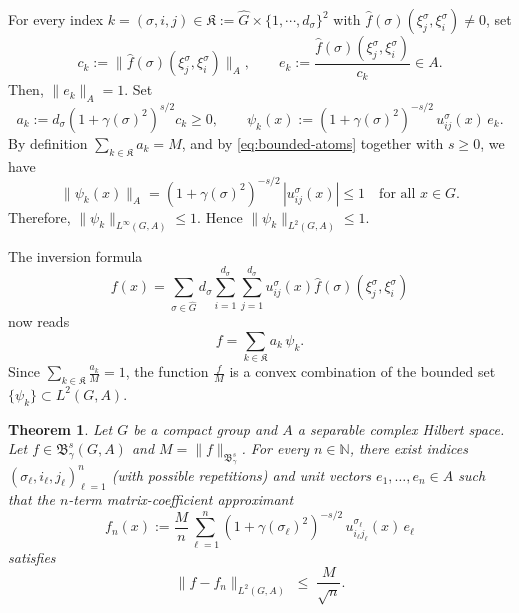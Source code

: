 \documentclass[12pt]{amsart}%
\newtheorem{theorem}{Theorem}[section]
\begin{document}
For every index $k=(\sigma,i,j)\in \mathfrak{K}:=\widehat{G}\times \{1,\cdots,d_\sigma\}^2$ with $\widehat{f}(\sigma)(\xi^\sigma_j,\xi^\sigma_i)\ne 0$, set
$$
c_k := \big\|\widehat{f}(\sigma)(\xi^\sigma_j,\xi^\sigma_i)\big\|_A, \qquad
e_k := \frac{\widehat{f}(\sigma)(\xi^\sigma_j,\xi^\sigma_i)}{c_k} \in A.$$ Then, $\|e_k\|_A=1$.
 Set 
 $$
a_k := d_\sigma (1+\gamma(\sigma)^2)^{s/2} c_k \ge 0, \qquad
\psi_k(x) := (1+\gamma(\sigma)^2)^{-s/2}\, u^\sigma_{ij}(x)\, e_k.
$$
By definition $\sum\limits_{k\in\mathfrak{K}} a_k = M$, and by \eqref{eq:bounded-atoms} together with $s \ge 0$, we have 
$$
\|\psi_k(x)\|_A = (1+\gamma(\sigma)^2)^{-s/2}\,|u^\sigma_{ij}(x)| \le 1
\quad \text{for all } x \in G.
$$
Therefore,  $\|\psi_k\|_{L^\infty(G,A)} \le 1$. Hence $\|\psi_k\|_{L^2(G,A)}\le 1$.
 
The inversion formula
$$
f(x) = \sum_{\sigma\in\widehat{G}} d_\sigma \sum_{i=1}^{d_\sigma}\sum_{j=1}^{d_\sigma}
u^\sigma_{ij}(x)\widehat{f}(\sigma)(\xi^\sigma_j,\xi^\sigma_i)
$$
now reads
\begin{equation}\label{eq:barycenter}
f = \sum_{k\in \mathfrak{K}} a_k\, \psi_k. 
\end{equation} 
Since $\sum\limits_{k\in\mathfrak{K}} \frac{a_k}{M} = 1$, 
the function  $\frac{f}{M}$ is a convex combination  of the bounded
set $\{\psi_k\} \subset L^2(G,A)$.
 
 
\begin{theorem}\label{thm:main}
Let $G$ be a compact group and $A$ a separable complex Hilbert space. Let  $f \in \mathfrak{B}^s_\gamma(G,A)$ and $M = \|f\|_{\mathfrak{B}^s_\gamma}$. For every $n \in \mathbb{N}$, 
there exist indices $(\sigma_\ell,i_\ell,j_\ell)_{\ell=1}^n$ (with possible
repetitions) and unit vectors $e_1,\dots,e_n \in A$ such that the $n$-term
matrix-coefficient approximant
\[
f_n(x) := \frac{M}{n} \sum_{\ell=1}^n
(1+\gamma(\sigma_\ell)^2)^{-s/2}\, u^{\sigma_\ell}_{i_\ell j_\ell}(x)\, e_\ell
\]
satisfies
$$
\|f - f_n\|_{L^2(G,A)} \;\le\; \frac{M}{\sqrt n}.
$$
\end{theorem}
 
\end{document}
